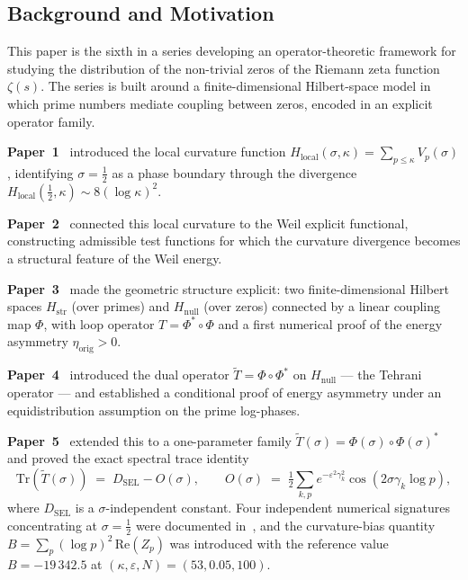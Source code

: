 \documentclass[11pt]{article}
\newcommand{\Hstr}{H_{\mathrm{str}}}
\newcommand{\Hnull}{H_{\mathrm{null}}}
\newcommand{\etaorig}{\eta_{\mathrm{orig}}}
\newcommand{\Tt}{\widetilde{T}}
\newcommand{\Hlocal}{H_{\mathrm{local}}}
\newcommand{\DSEL}{D_{\mathrm{SEL}}}
\begin{document}
\subsection{Background and Motivation}

This paper is the sixth in a series developing an operator-theoretic
framework for studying the distribution of the non-trivial zeros of
the Riemann zeta function $\zeta(s)$.
The series is built around a finite-dimensional Hilbert-space model in
which prime numbers mediate coupling between zeros, encoded in an
explicit operator family.

\textbf{Paper~1}~\cite{Paper1} introduced the local curvature function
$\Hlocal(\sigma,\kappa)=\sum_{p\le\kappa}V_p(\sigma)$, identifying
$\sigma=\tfrac12$ as a phase boundary through the divergence
$\Hlocal(\tfrac12,\kappa)\sim 8(\log\kappa)^2$.

\textbf{Paper~2}~\cite{Paper2} connected this local curvature to the
Weil explicit functional, constructing admissible test functions
for which the curvature divergence becomes a structural feature of
the Weil energy.

\textbf{Paper~3}~\cite{Paper3} made the geometric structure explicit:
two finite-dimensional Hilbert spaces $\Hstr$ (over primes) and
$\Hnull$ (over zeros) connected by a linear coupling map $\Phi$, with
loop operator $T=\Phi^*\circ\Phi$ and a first numerical proof of the
energy asymmetry $\etaorig>0$.

\textbf{Paper~4}~\cite{Paper4} introduced the dual operator
$\Tt=\Phi\circ\Phi^*$ on $\Hnull$ --- the Tehrani operator --- and
established a conditional proof of energy asymmetry under an
equidistribution assumption on the prime log-phases.

\textbf{Paper~5}~\cite{Paper5} extended this to a one-parameter
family $\Tt(\sigma)=\Phi(\sigma)\circ\Phi(\sigma)^*$ and proved the
exact spectral trace identity
\[
\mathrm{Tr}(\Tt(\sigma)) \;=\; \DSEL - O(\sigma),
\qquad
O(\sigma) \;=\; \tfrac12\sum_{k,p} e^{-\varepsilon^2\gamma_k^2}
                \cos(2\sigma\gamma_k\log p),
\]
where $\DSEL$ is a $\sigma$-independent constant.
Four independent numerical signatures concentrating at $\sigma=\tfrac12$
were documented in~\cite{Paper4,Paper5}, and the curvature-bias quantity
$B=\sum_p(\log p)^2\,\mathrm{Re}(Z_p)$ was introduced with the reference
value $B=-19\,342.5$ at $(\kappa,\varepsilon,N)=(53,0.05,100)$.
\end{document}
